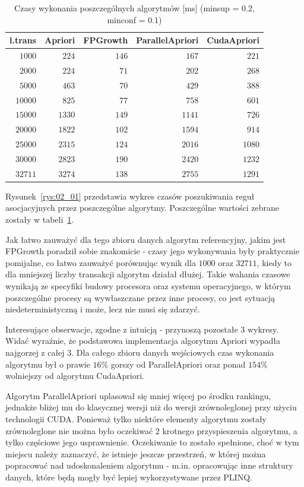 \begin{table}
	\centering
	\begin{tabular}{r|r|r|r|r}
	\textbf{l.trans} & \textbf{Apriori} & \textbf{FPGrowth} & \textbf{ParallelApriori} & \textbf{CudaApriori} \\ \hline
	$1000$ & $224$ & $146$ & $167$ & $221$ \\
	$2000$ & $224$ & $71$ & $202$ & $268$ \\
	$5000$ & $463$ & $70$ & $429$ & $388$ \\
	$10000$ & $825$ & $77$ & $758$ & $601$ \\
	$15000$ & $1330$ & $149$ & $1141$ & $726$ \\
	$20000$ & $1822$ & $102$ & $1594$ & $914$ \\
	$25000$ & $2315$ & $124$ & $2016$ & $1080$ \\
	$30000$ & $2823$ & $190$ & $2420$ & $1232$ \\
	$32711$ & $3274$ & $138$ & $2755$ & $1291$ \\
	\end{tabular}
	\caption{Czasy wykonania poszczególnych algorytmów [ms] (minsup = 0.2, minconf = 0.1)\label{tab:02_01}}
\end{table}

Rysunek~\ref{rys:02_01} przedstawia wykres czasów poszukiwania reguł asocjacyjnych przez poszczególne algorytmy. Poszczególne wartości zebrane zostały w tabeli~\ref{tab:02_01}. 

Jak łatwo zauważyć dla tego zbioru danych algorytm referencyjny, jakim jest FPGrowth poradził sobie znakomicie - czasy jego wykonywania były praktycznie pomijalne, co łatwo zauważyć porównując wynik dla $1000$ oraz $32711$, kiedy to dla mniejszej liczby transakcji algorytm działał dłużej. Takie wahania czasowe wynikają ze specyfiki budowy procesora oraz systemu operacyjnego, w którym poszczególne procesy są wywłaszczane przez inne procesy, co jest sytuacją niedeterministyczną i może, lecz nie musi się zdarzyć.

Interesujące obserwacje, zgodne z intuicją - przynoszą pozostałe 3 wykresy. Widać wyraźnie, że podstawowa implementacja algorytmu Apriori wypadła najgorzej z całej 3. Dla całego zbioru danych wejściowych czas wykonania algorytmu był o prawie $16\%$ gorszy od ParallelApriori oraz ponad $154\%$ wolniejszy od algorytmu CudaApriori. 

Algorytm ParallelApriori uplasował się mniej więcej po środku rankingu, jednakże bliżej mu do klasycznej wersji niż do wersji zrównoleglonej przy użyciu technologii CUDA. Ponieważ tylko niektóre elementy algorytmu zostały zrównoleglone nie można było oczekiwać $2$ krotnego przyspieszenia algorytmu, a tylko częściowe jego usprawnienie. Oczekiwanie to zostało spełnione, choć w tym miejscu należy zaznaczyć, że istnieje jeszcze przestrzeń, w której można popracować nad udoskonaleniem algorytmu - m.in. opracowując inne struktury danych, które będą mogły być lepiej wykorzystywane przez PLINQ.

